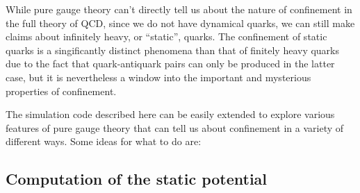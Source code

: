 \documentclass[11pt]{article}
\begin{document}



While pure gauge theory can't directly tell us about the nature of confinement in the full theory of QCD, since we do not have dynamical quarks, we can still make claims about infinitely heavy, or ``static'', quarks. The confinement of static quarks is a singificantly distinct phenomena than that of finitely heavy quarks due to the fact that quark-antiquark pairs can only be produced in the latter case, but it is nevertheless a window into the important and mysterious properties of confinement.

The simulation code described here can be easily extended to explore various features of pure gauge theory that can tell us about confinement in a variety of different ways. Some ideas for what to do are:

\subsection{Computation of the static potential} 
\end{document}
